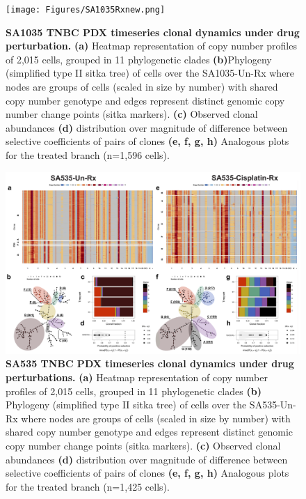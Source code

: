 \begin{figure}
\centering
\texttt{[image: Figures/SA1035Rxnew.png]}
	
\caption[SA1035 TNBC PDX timeseries clonal dynamics under drug perturbation]
	{\small
	\textbf{SA1035 TNBC PDX timeseries clonal dynamics under drug perturbation.}
	    \textbf{(a)} Heatmap representation of copy number profiles of
2,015 cells, grouped in 11 phylogenetic clades  \textbf{(b)}Phylogeny (simplified type II sitka tree) of cells over the SA1035-Un-Rx where nodes are groups of cells (scaled in size by number) with shared copy number genotype and edges represent distinct genomic copy number change points (sitka markers). \textbf{(c)} Observed clonal abundances \textbf{(d)} distribution over magnitude of difference between selective coefficients of pairs of clones \textbf{(e, f, g, h)} Analogous plots for the treated branch (n=1,596 cells).
	}
	\label{fig:SA1035Rxnew}
\end{figure}



\begin{figure}
\centering
\includegraphics[width=\textwidth]{Figures/SA535analysis.png}
	
\caption[SA535 TNBC PDX timeseries clonal dynamics under drug perturbations]
	{\small
	\textbf{SA535 TNBC PDX timeseries clonal dynamics under drug perturbations.}
	     \textbf{(a)} Heatmap representation of copy number profiles of
2,015 cells, grouped in 11 phylogenetic clades  \textbf{(b)} Phylogeny (simplified type II sitka tree) of cells over the SA535-Un-Rx where nodes are groups of cells (scaled in size by number) with shared copy number genotype and edges represent distinct genomic copy number change points (sitka markers). \textbf{(c)} Observed clonal abundances \textbf{(d)} distribution over magnitude of difference between selective coefficients of pairs of clones \textbf{(e, f, g, h)} Analogous plots for the treated branch (n=1,425 cells).
	}
	\label{fig:SA535analysis}
\end{figure}

